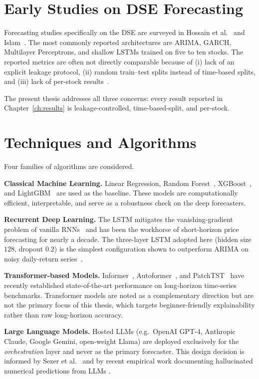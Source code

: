 \documentclass[12pt,a4paper,oneside]{report}
\begin{document}
\section{Early Studies on DSE Forecasting}

Forecasting studies specifically on the DSE are surveyed in
Hossain et al.~\cite{hossain2019dse} and Islam~\cite{islam2018forecasting}.
The most commonly reported architectures are \ac{ARIMA}, \ac{GARCH},
Multilayer Perceptrons, and shallow \acp{LSTM} trained on five to
ten stocks. The reported metrics are often not directly comparable
because of (i) lack of an explicit leakage protocol, (ii) random
train--test splits instead of time-based splits, and (iii) lack of
per-stock results~\cite{goodfellow2016deep}.

The present thesis addresses all three concerns: every result
reported in Chapter~\ref{ch:results} is leakage-controlled,
time-based-split, and per-stock.

\section{Techniques and Algorithms}

Four families of algorithms are considered.

\textbf{Classical Machine Learning.} Linear Regression, Random
Forest~\cite{breiman2001random}, XGBoost~\cite{chen2016xgboost}, and
LightGBM~\cite{ke2017lightgbm} are used as the baseline. These models
are computationally efficient, interpretable, and serve as a
robustness check on the deep forecasters.

\textbf{Recurrent Deep Learning.} The \ac{LSTM}
\cite{hochreiter1997long} mitigates the vanishing-gradient
problem of vanilla \acp{RNN}~\cite{cho2014gru} and has been the workhorse of
short-horizon price forecasting for nearly a decade.
The three-layer \ac{LSTM} adopted here (hidden size $128$,
dropout $0.2$) is the simplest configuration shown to outperform
\ac{ARIMA} on noisy daily-return series~\cite{fischer2018deep}.

\textbf{Transformer-based Models.} Informer~\cite{zhou2021informer},
Autoformer~\cite{wu2021autoformer}, and PatchTST~\cite{nie2023patchtst}
have recently established state-of-the-art performance on
long-horizon time-series benchmarks. Transformer models are noted
as a complementary direction but are not the primary focus of this
thesis, which targets beginner-friendly explainability rather than
raw long-horizon accuracy.

\textbf{Large Language Models.} Hosted \acp{LLM} (e.g.\ OpenAI
GPT-4, Anthropic Claude, Google Gemini, open-weight Llama) are
deployed exclusively for the \emph{orchestration} layer and never
as the primary forecaster. This design decision is informed by
Sezer et al.~\cite{sezer2020financial} and by recent empirical work
documenting hallucinated numerical predictions from \acp{LLM}
\cite{lopez2023canchatgpt}.
\end{document}
